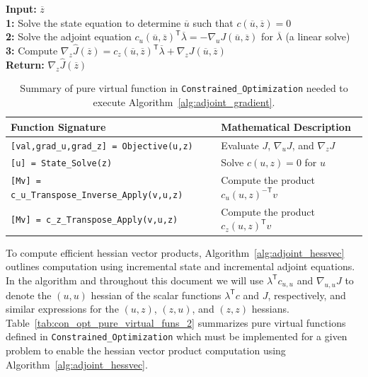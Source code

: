 \documentclass{article}
\newcommand{\trp}{^{\mathsf{T}}}
\newcommand{\invtrp}{^{-\mathsf{T}}}
\begin{document}
\begin{algorithm}
\caption{Adjoint-based gradient calculation}
\label{alg:adjoint_gradient}
\textbf{Input: } $\overline{z}$\\
\textbf{1: } Solve the state equation to determine $\overline{u}$ such that $c(\overline{u},\overline{z})=0$\\
\textbf{2: } Solve the adjoint equation $c_u(\overline{u},\overline{z})\trp \overline{\lambda} = - \nabla_u J(\overline{u},\overline{z})$ for $\overline{\lambda}$ (a linear solve) \\
\textbf{3: } Compute $\nabla_z \hat{J}(\overline{z}) = c_z(\overline{u},\overline{z})\trp \overline{\lambda} + \nabla_z J(\overline{u},\overline{z})$ \\
\textbf{Return: } $\nabla_z \hat{J}(\overline{z})$
\end{algorithm}

\begin{table}[!ht]
\centering
\begin{tabular}{|l|l|}
    \hline
    Function Signature & Mathematical Description
    \\ \hline
    \texttt{[val,grad\_u,grad\_z] = Objective(u,z)}
    & Evaluate $J$, $\nabla_u J$, and $\nabla_z J$
    \\
    \texttt{[u] = State\_Solve(z)}
    & Solve $c(u,z)=0$ for $u$
    \\
    \texttt{[Mv] = c\_u\_Transpose\_Inverse\_Apply(v,u,z)}
    & Compute the product $c_u(u,z)\invtrp v$
    \\
    \texttt{[Mv] = c\_z\_Transpose\_Apply(v,u,z)}
    & Compute the product $c_z(u,z)\trp v$
    \\ \hline
\end{tabular}
\caption{Summary of pure virtual function in \texttt{Constrained\_Optimization} needed to execute Algorithm~\ref{alg:adjoint_gradient}.}
\label{tab:con_opt_pure_virtual_funs_1}
\end{table}

To compute efficient hessian vector products, Algorithm~\ref{alg:adjoint_hessvec} outlines computation using incremental state and incremental adjoint equations. In the algorithm and throughout this document we will use $\lambda\trp c_{u,u}$ and $\nabla_{u,u} J$ to denote the $(u,u)$ hessian of the scalar functions $\lambda\trp c$ and $J$, respectively, and similar expressions for the $(u,z)$, $(z,u)$, and $(z,z)$ hessians. Table~\ref{tab:con_opt_pure_virtual_funs_2} summarizes pure virtual functions defined in \texttt{Constrained\_Optimization} which must be implemented for a given problem to enable the hessian vector product computation using Algorithm~\ref{alg:adjoint_hessvec}.
\end{document}
